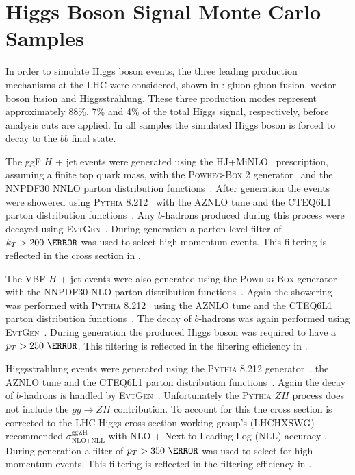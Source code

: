 \section{Higgs Boson Signal Monte Carlo Samples} \label{sec:data:signal_mc}

In order to simulate Higgs boson events, the three leading production
mechanisms at the LHC were considered, shown in :
gluon-gluon fusion, vector boson fusion and Higgsstrahlung.  These three
production modes represent approximately 88\%, 7\% and 4\% of the total Higgs
signal, respectively, before analysis cuts are applied.  In all samples the
simulated Higgs boson is forced to decay to the $b\bar{b}$ final state.
 
The ggF $H$ + jet events were generated using the HJ+MiNLO~\cite{Hamilton2015}
prescription, assuming a finite top quark mass, with the \textsc{Powheg-Box} 2
generator~\cite{Campbell2012} and the NNPDF30 NNLO parton distribution
functions~\cite{Hamilton:2012rf}.  After generation the events were showered
using \textsc{Pythia} 8.212~\cite{Sjostrand:2014zea} with the AZNLO tune and
the CTEQ6L1 parton distribution functions~\cite{Pumplin:2002vw}. Any
$b$-hadrons produced during this process were decayed using
\textsc{EvtGen}~\cite{LANGE2001152}. During generation a parton level filter of
$k_{T} > 200~\GeV$ was used to select high momentum events.  This filtering is
reflected in the cross section in .

The VBF $H$ + jet events were also generated using the \textsc{Powheg-Box}
generator~\cite{Nason:2009ai} with the NNPDF30 NLO parton distribution
functions~\cite{Hamilton:2012rf}. Again the showering was performed with
\textsc{Pythia} 8.212~\cite{Sjostrand:2014zea} using the AZNLO tune and the
CTEQ6L1 parton distribution functions~\cite{Pumplin:2002vw}.  The decay of
$b$-hadrons was again performed using \textsc{EvtGen}~\cite{LANGE2001152}.
During generation the produced Higgs boson was required to have a $p_{T} >
250~\GeV$.  This filtering is reflected in the filtering efficiency in
.

Higgsstrahlung events were generated using the \textsc{Pythia} 8.212
generator~\cite{Sjostrand:2014zea}, the AZNLO tune and the CTEQ6L1 parton
distribution functions~\cite{Pumplin:2002vw}.  Again the decay of $b$-hadrons
is handled by \textsc{EvtGen}~\cite{LANGE2001152}. Unfortunately the
\textsc{Pythia} $ZH$ process does not include the $gg \rightarrow ZH$
contribution.  To account for this the cross section is corrected to the LHC
Higgs cross section working group's (LHCHXSWG) recommended
$\sigma_{\text{NLO+NLL}}^{\text{ggZH}}$ with NLO + Next to Leading Log (NLL)
accuracy \cite{MelladoGarcia:2150771}. During generation a filter of $p_{T} >
350~\GeV$ was used to select for high momentum events. This
filtering is reflected in the filtering efficiency in .

